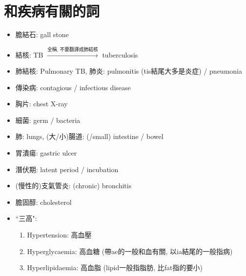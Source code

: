 \section{和疾病有關的詞}
\begin{itemize}
  \itemsep0em
  \item 膽結石: gall stone
  \item 結核: TB $\xrightarrow{\text{全稱, 不要翻譯成肺結核}}$ tuberculosis
  \item 肺結核: Pulmonary TB, 肺炎: pulmonitis (tis結尾大多是炎症) / pneumonia
  \item 傳染病: contagious / infectious disease
  \item 胸片: chest X-ray
  \item 細菌: germ / bacteria
  \item 肺: lungs, (大/小)腸道: (/small) intestine / bowel
  \item 胃潰瘍: gastric ulcer
  \item 潛伏期: latent period / incubation
  \item (慢性的)支氣管炎: (chronic) bronchitis
  \item 膽固醇: cholesterol
  \item ``三高":
  \begin{enumerate}
    \itemsep0em
    \item Hypertension: 高血壓
    \item Hyperglycaemia: 高血糖 (帶ae的一般和血有關, 以ia結尾的一般指病)
    \item Hyperlipidaemia: 高血脂 (lipid一般指脂肪, 比fat指的要小)
  \end{enumerate}
\end{itemize}

